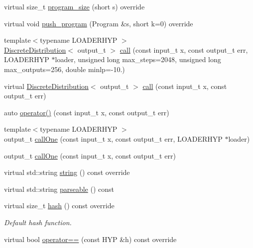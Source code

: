 \begin{DoxyCompactItemize}
\item 
virtual size\+\_\+t \hyperlink{class_l_o_t_hypothesis_a9fb7caa245a82c53bcfbac846ab1b327}{program\+\_\+size} (short s) override
\item 
virtual void \hyperlink{class_l_o_t_hypothesis_a2b9a0eca1e2124f92bd34d8da929fe71}{push\+\_\+program} (Program \&s, short k=0) override
\item 
{\footnotesize template$<$typename L\+O\+A\+D\+E\+R\+H\+YP $>$ }\\\hyperlink{class_discrete_distribution}{Discrete\+Distribution}$<$ output\+\_\+t $>$ \hyperlink{class_l_o_t_hypothesis_a9f528a8b204b87cc6fcf8d81c8c2b036}{call} (const input\+\_\+t x, const output\+\_\+t err, L\+O\+A\+D\+E\+R\+H\+YP $\ast$loader, unsigned long max\+\_\+steps=2048, unsigned long max\+\_\+outputs=256, double minlp=-\/10.)
\item 
virtual \hyperlink{class_discrete_distribution}{Discrete\+Distribution}$<$ output\+\_\+t $>$ \hyperlink{class_l_o_t_hypothesis_a3e46160113b9602cff4c4765c768b57d}{call} (const input\+\_\+t x, const output\+\_\+t err)
\item 
auto \hyperlink{class_l_o_t_hypothesis_a7275626861140284ee08512fd0641ce1}{operator()} (const input\+\_\+t x, const output\+\_\+t err)
\item 
{\footnotesize template$<$typename L\+O\+A\+D\+E\+R\+H\+YP $>$ }\\output\+\_\+t \hyperlink{class_l_o_t_hypothesis_a34051e59cc251c4d6bb3caddbe594414}{call\+One} (const input\+\_\+t x, const output\+\_\+t err, L\+O\+A\+D\+E\+R\+H\+YP $\ast$loader)
\item 
output\+\_\+t \hyperlink{class_l_o_t_hypothesis_a834197767cb83a17c6b3eb564e11a3b2}{call\+One} (const input\+\_\+t x, const output\+\_\+t err)
\item 
virtual std\+::string \hyperlink{class_l_o_t_hypothesis_acda322aef217a0d358ae6cea19969904}{string} () const override
\item 
virtual std\+::string \hyperlink{class_l_o_t_hypothesis_a4037b5dea60aeb19d72c16e308886bc2}{parseable} () const
\item 
virtual size\+\_\+t \hyperlink{class_l_o_t_hypothesis_a7c33d51f8d81762b1eca7f86b596236a}{hash} () const override
\begin{DoxyCompactList}\small\item\em Default hash function. \end{DoxyCompactList}\item 
virtual bool \hyperlink{class_l_o_t_hypothesis_acf5a682dce5d3971474a22778479a99a}{operator==} (const H\+YP \&h) const override

\end{DoxyCompactItemize}
